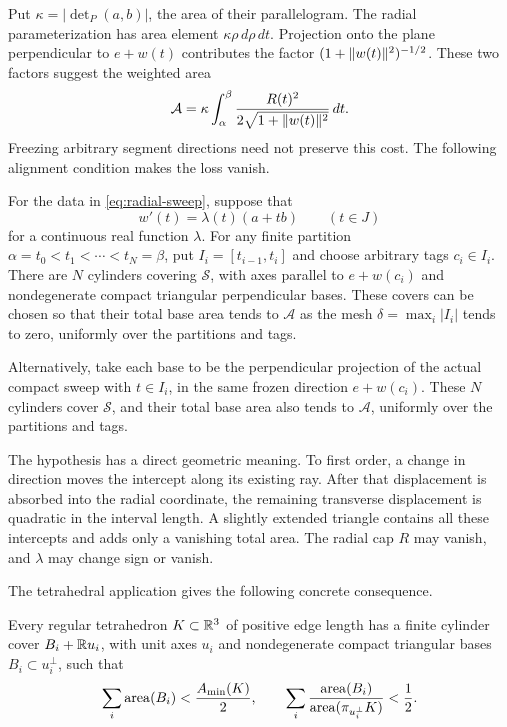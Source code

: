 Put $\kappa=|\det_P(a,b)|$, the area of their parallelogram.
The radial parameterization has area element $\kappa\rho\,d\rho\,dt$.
Projection onto the plane perpendicular to $e+w(t)$ contributes
the factor $(1+\lVert w(t)\rVert^2)^{-1/2}$. These two factors suggest the
weighted area
\begin{equation}\label{eq:weighted-area}
 \mathcal A=\kappa\int_\alpha^\beta
       \frac{R(t)^2}{2\sqrt{1+\lVert w(t)\rVert^2}}\,dt.
\end{equation}
Freezing arbitrary segment directions need not preserve this cost.
The following alignment condition makes the loss vanish.

\begin{theorem}\label{thm:radial}
For the data in \eqref{eq:radial-sweep}, suppose that
\[
 w'(t)=\lambda(t)(a+tb)\qquad(t\in J)
\]
for a continuous real function $\lambda$.
For any finite partition
\(\alpha=t_0<t_1<\cdots<t_N=\beta\), put \(I_i=[t_{i-1},t_i]\)
and choose arbitrary tags \(c_i\in I_i\). There are \(N\) cylinders
covering \(\mathcal S\), with axes parallel to \(e+w(c_i)\) and
nondegenerate compact triangular perpendicular bases. These covers
can be chosen so that their total base area tends to \(\mathcal A\)
as the mesh \(\delta=\max_i|I_i|\) tends to zero, uniformly over the
partitions and tags.

Alternatively, take each base to be the perpendicular projection of
the actual compact sweep with \(t\in I_i\), in the same frozen
direction \(e+w(c_i)\). These \(N\) cylinders cover \(\mathcal S\),
and their total base area also tends to \(\mathcal A\), uniformly
over the partitions and tags.
\end{theorem}

The hypothesis has a direct geometric meaning. To first order, a
change in direction moves the intercept along its existing ray.
After that displacement is absorbed into the radial coordinate, the
remaining transverse displacement is quadratic in the interval length.
A slightly extended triangle contains all these intercepts and adds
only a vanishing total area. The radial cap $R$ may vanish, and
$\lambda$ may change sign or vanish.

The tetrahedral application gives the following concrete consequence.
\begin{corollary}\label{cor:tetrahedron}
Every regular tetrahedron $K\subset\mathbb R^3$ of positive edge length has
a finite cylinder cover $B_i+\mathbb R u_i$, with unit axes $u_i$ and
nondegenerate compact triangular bases $B_i\subset u_i^\perp$, such that
\[
 \sum_i\operatorname{area}(B_i)<\frac{A_{\min}(K)}2,
 \qquad
 \sum_i\frac{\operatorname{area}(B_i)}{\operatorname{area}(\pi_{u_i^\perp}K)}<\frac12.
\]
\end{corollary}

